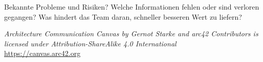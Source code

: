 \documentclass[a4paper,11pt,landscape,draft]{article}
\newcommand{\risksmissinginfocontent}{
Bekannte Probleme und Risiken? Welche Informationen fehlen oder sind verloren gegangen? Was hindert das Team daran, schneller besseren Wert zu liefern?
}
\newlength{\baseheight}
\newlength{\rowgap}
\begin{document}
\vspace{\rowgap}

\noindent
\begin{minipage}[t]{\textwidth}
\begin{tcolorbox}[
    enhanced,
    colback=white,
    colbacktitle=accred,
    colframe=accred,
    boxrule=0.8mm,
    arc=2mm,
    height=2\baseheight,
    title={\textbf{Risks and Missing Information}},
    fonttitle=\bfseries\color{black},
    coltitle=black,
    left=4mm,
    right=4mm,
    top=2mm,
    bottom=4mm
]
\small
\risksmissinginfocontent
\end{tcolorbox}
\end{minipage}

\begin{center}
\scriptsize
\textit{Architecture Communication Canvas by Gernot Starke and arc42 Contributors is licensed under Attribution-ShareAlike 4.0 International}\\
\url{https://canvas.arc42.org}
\end{center}
\end{document}
